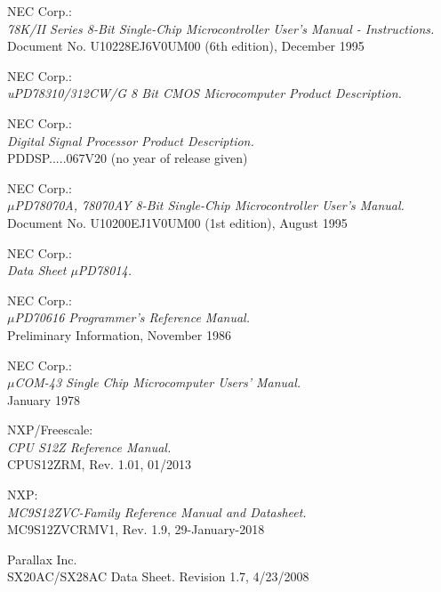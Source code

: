  NEC Corp.: \\
                {\em 78K/II Series 8-Bit Single-Chip Microcontroller
                 User's Manual - Instructions.\/} \\
                Document No. U10228EJ6V0UM00 (6th edition), December 1995

 NEC Corp.: \\
		{\em uPD78310/312CW/G 8 Bit CMOS Microcomputer Product
                 Description.\/}

 NEC Corp.: \\
                {\em Digital Signal Processor Product Description.\/} \\
                PDDSP.....067V20 (no year of release given)

 NEC Corp.: \\
                {\em $\mu$PD78070A, 78070AY 8-Bit Single-Chip Microcontroller
                 User's Manual.\/} \\
                Document No. U10200EJ1V0UM00 (1st edition), August 1995

 NEC Corp.: \\
                  {\em Data Sheet $\mu$PD78014.\/}

 NEC Corp.: \\
                {\em $\mu$PD70616 Programmer's Reference Manual.\/} \\
                Preliminary Information, November 1986

 NEC Corp.: \\
                {\em $\mu$COM-43 Single Chip Microcomputer Users' Manual.\/} \\
                January 1978

 NXP/Freescale: \\
                {\em CPU S12Z Reference Manual.} \\
                CPUS12ZRM, Rev. 1.01, 01/2013

 NXP: \\
                {\em MC9S12ZVC-Family Reference Manual and Datasheet.} \\
                MC9S12ZVCRMV1, Rev. 1.9, 29-January-2018

 Parallax Inc. \\
                  { SX20AC/SX28AC Data Sheet.}
                  Revision 1.7, 4/23/2008

